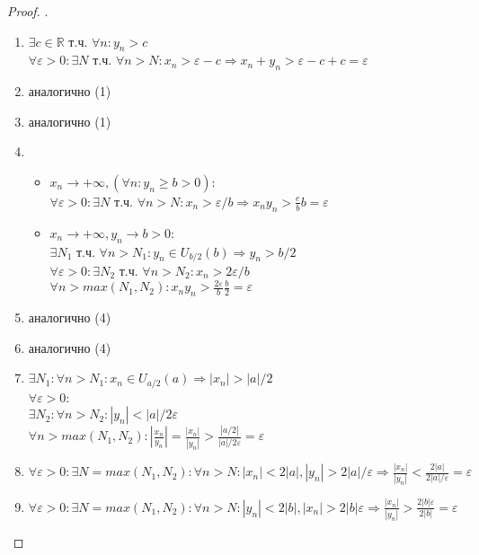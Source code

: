 \documentclass[11pt,a4paper,titlepage]{article}
\renewcommand{\implies}{\Rightarrow}
\renewcommand{\epsilon}{\varepsilon}
\newcommand{\R}{\mathbb{R}}
\begin{document}
    \begin{proof}
        .\\
        \begin{enumerate}
            \item $\exists c \in \R$ т.ч. $\forall n: y_n > c$\\
            $\forall \epsilon > 0: \exists N$ т.ч. $\forall n > N: x_n > \epsilon - c \implies x_n + y_n > \epsilon - c + c = \epsilon$
            \item аналогично (1)
            \item аналогично (1)
            \item \begin{itemize}
                      \item $x_n \to +\infty, (\forall n: y_n \geq b > 0):$\\
                      $\forall \epsilon > 0: \exists N$ т.ч. $\forall n > N: x_n > \epsilon/b \implies x_n y_n > \frac{e}{b}b = \epsilon $
                      \item $x_n \to +\infty, y_n \to b > 0:$\\
                      $\exists N_1$ т.ч. $\forall n > N_1: y_n \in U_{b/2}(b) \implies y_n > b/2$\\
                      $\forall \epsilon > 0: \exists N_2$ т.ч. $\forall n > N_2: x_n > 2\epsilon/b$\\
                      $\forall n > max(N_1, N_2): x_n y_n > \frac{2\epsilon}{b}\frac{b}{2} = \epsilon$
            \end{itemize}
            \item аналогично (4)
            \item аналогично (4)
            \item $\exists N_1: \forall n > N_1: x_n \in U_{a/2}(a) \implies |x_n| > |a|/2$\\
            $\forall \epsilon > 0$:\\
            $\exists N_2: \forall n > N_2: |y_n| < |a|/2\epsilon$\\
            $\forall n > max(N_1,N_2): |\frac{x_n}{y_n}|=\frac{|x_n|}{|y_n|} > \frac{|a/2|}{|a|/2\epsilon} = \epsilon$
            \item $\forall \epsilon > 0: \exists N = max(N_1, N_2): \forall n > N: |x_n| < 2|a|, |y_n|>2|a|/\epsilon \implies \frac{|x_n|}{|y_n|} < \frac{2|a|}{2|a|/\epsilon} = \epsilon$
            \item $\forall \epsilon > 0: \exists N = max(N_1, N_2): \forall n > N: |y_n| < 2|b|, |x_n|>2|b|\epsilon \implies \frac{|x_n|}{|y_n|} > \frac{2|b|\epsilon}{2|b|} = \epsilon$
        \end{enumerate}
    \end{proof}
\end{document}
